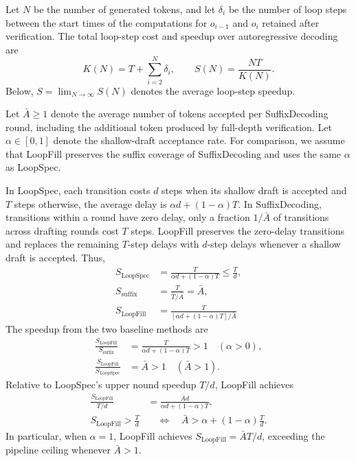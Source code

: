 Let $N$ be the number of generated tokens, and let $\delta_i$ be
the number of loop steps between the start times of the computations
for $o_{i-1}$ and $o_i$ retained after verification.
The total loop-step cost and speedup over autoregressive decoding are
\begin{equation}
  K(N)=T+\sum_{i=2}^{N}\delta_i,
  \qquad
  S(N)=\frac{NT}{K(N)}.
  \label{eq:steps}
\end{equation}
Below, $S=\lim_{N\to\infty}S(N)$ denotes the average
loop-step speedup.

Let $\bar A\geq 1$ denote the average number of tokens accepted
per SuffixDecoding round, including the additional token produced
by full-depth verification. Let $\alpha\in[0,1]$ denote the
shallow-draft acceptance rate. For comparison, we assume that
LoopFill preserves the suffix coverage of SuffixDecoding and uses
the same $\alpha$ as LoopSpec.

In LoopSpec, each transition costs $d$ steps when its shallow
draft is accepted and $T$ steps otherwise, the average delay
is $\alpha d+(1-\alpha)T$.
In SuffixDecoding, transitions within a round have zero delay,
only a fraction $1/\bar A$ of transitions across drafting rounds cost $T$ steps.
LoopFill preserves the zero-delay transitions and replaces the
remaining $T$-step delays with $d$-step delays whenever a shallow
draft is accepted. Thus,
\begin{align}
  S_{\mathrm{LoopSpec}}
  &=\frac{T}{\alpha d+(1-\alpha)T}
    \leq\frac{T}{d},
  \label{eq:loopspec}\\
  S_{\mathrm{suffix}}
  &=\frac{T}{T/\bar A}=\bar A,
  \label{eq:suffix}\\
  S_{\mathrm{LoopFill}}
  &=\frac{T}{[\alpha d+(1-\alpha)T]/\bar A}
  \label{eq:combined}
\end{align}
The speedup from the two baseline methods are
\begin{equation}
  \begin{aligned}
    \frac{S_{\mathrm{LoopFill}}}{S_{\mathrm{suffix}}}
    &=\frac{T}{\alpha d+(1-\alpha)T}
      >1 \quad (\alpha>0),\\
    \frac{S_{\mathrm{LoopFill}}}{S_{\mathrm{LoopSpec}}}
    &=\bar A>1 \quad (\bar A>1).
  \end{aligned}
  \label{eq:relative-speedups}
\end{equation}
Relative to LoopSpec's upper nound speedup $T/d$, LoopFill achieves
\begin{equation}
  \begin{aligned}
    \frac{S_{\mathrm{LoopFill}}}{T/d}
    &=\frac{\bar A d}{\alpha d+(1-\alpha)T},\\
    S_{\mathrm{LoopFill}}>\frac{T}{d}
    &\quad\Longleftrightarrow\quad
      \bar A>\alpha+(1-\alpha)\frac{T}{d}.
  \end{aligned}
  \label{eq:pipeline-ceiling}
\end{equation}
In particular, when $\alpha=1$, LoopFill achieves
$S_{\mathrm{LoopFill}}=\bar A T/d$, exceeding the pipeline
ceiling whenever $\bar A>1$.
